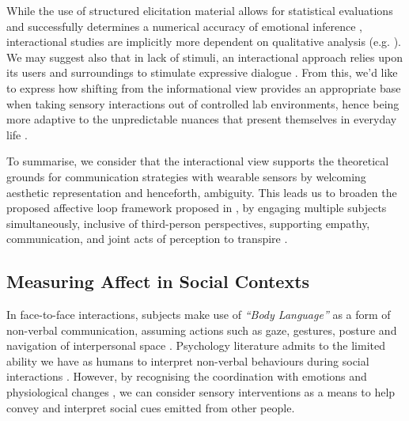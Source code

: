 While the use of structured elicitation material allows for statistical evaluations and successfully determines a numerical accuracy of emotional inference \cite{bota_review_2019}, interactional studies are implicitly more dependent on qualitative analysis (e.g. \cite{hook_embracing_2018,howell_life-affirming_2019}). We may suggest also that in lack of stimuli, an interactional approach relies upon its users and surroundings to stimulate expressive dialogue \cite{gonzalez_dance-inspired_2012}. From this, we'd like to express how shifting from the informational view provides an appropriate base when taking sensory interactions out of controlled lab environments, hence being more adaptive to the unpredictable nuances that present themselves in everyday life \cite{brown_into_2011,stjerna_aspects_2013,maki-petaja_aesthetic_2014}.


To summarise, we consider that the interactional view supports the theoretical grounds for communication strategies with wearable sensors by welcoming aesthetic representation and henceforth, ambiguity. This leads us to broaden the proposed affective loop framework proposed in \cite{hook_affective_2009}, by engaging multiple subjects simultaneously, inclusive of third-person perspectives, supporting empathy, communication, and joint acts of perception to transpire \cite{turmo_vidal_designing_2021,francoise_designing_2017}.

\subsection*{Measuring Affect in Social Contexts}
\label{lit_reivew:ssp}
In face-to-face interactions, subjects make use of \textit{``Body Language''} as a form of non-verbal communication, assuming actions such as gaze, gestures, posture and navigation of interpersonal space \cite{dobre_immersive_2022}. Psychology literature admits to the limited ability we have as humans to interpret non-verbal behaviours during social interactions \cite{joseph_emotional_2010}. However, by recognising the coordination with emotions and physiological changes \cite{mayer_human_2008}, we can consider sensory interventions as a means to help convey and interpret social cues emitted from other people.

